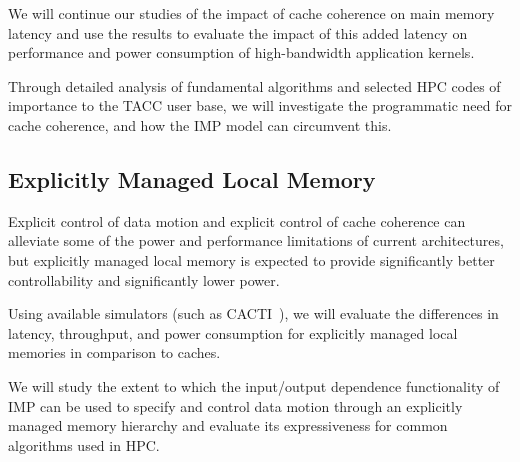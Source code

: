 We will continue our studies of the impact of cache coherence on main memory 
latency and use the results to evaluate the impact of this added latency on 
performance and power consumption of high-bandwidth application kernels.

Through detailed analysis of fundamental algorithms and selected HPC codes of 
importance to the TACC user base, we will investigate the programmatic 
need for cache coherence, and how the IMP model can circumvent this.  

\subsection{Explicitly Managed Local Memory}
\label{sec:propose-rdma}

Explicit control of data motion and explicit control of cache coherence can
alleviate some of the power and performance limitations of current architectures, 
but explicitly managed local memory is expected to provide significantly better
controllability and significantly lower power.

Using available simulators (such as CACTI~\cite{CACTI-D_2008}), we will 
evaluate the differences in latency, throughput, and power consumption for
explicitly managed local memories in comparison to caches.   

We will study the extent to which the input/output dependence functionality of IMP can be used to 
specify and control data motion through an explicitly managed memory hierarchy
and evaluate its expressiveness for common algorithms used in HPC.

